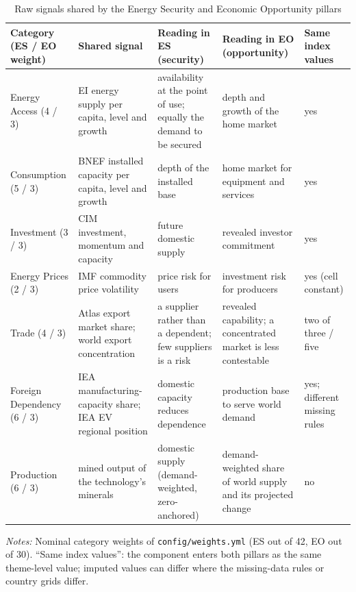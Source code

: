 \begin{table}[t]
\centering
\begin{threeparttable}
\caption{Raw signals shared by the Energy Security and Economic Opportunity pillars}
\label{tab:shared_signals}
\scriptsize
\setlength{\tabcolsep}{3pt}
\begin{tabularx}{\textwidth}{@{}>{\raggedright\arraybackslash}p{2.0cm}
  >{\raggedright\arraybackslash}p{2.9cm}
  >{\raggedright\arraybackslash}X
  >{\raggedright\arraybackslash}X
  >{\centering\arraybackslash}p{1.3cm}@{}}
\toprule
Category (ES / EO weight) & Shared signal & Reading in ES (security) & Reading in EO (opportunity) & Same index values\\
\midrule
Energy Access (4 / 3) & EI energy supply per capita, level and growth &
availability at the point of use; equally the demand to be secured &
depth and growth of the home market & yes\\
\addlinespace
Consumption (5 / 3) & BNEF installed capacity per capita, level and growth &
depth of the installed base & home market for equipment and services & yes\\
\addlinespace
Investment (3 / 3) & CIM investment, momentum and capacity &
future domestic supply & revealed investor commitment & yes\\
\addlinespace
Energy Prices (2 / 3) & IMF commodity price volatility & price risk for users &
investment risk for producers & yes (cell constant)\\
\addlinespace
Trade (4 / 3) & Atlas export market share; world export concentration &
a supplier rather than a dependent; few suppliers is a risk &
revealed capability; a concentrated market is less contestable & two of three / five\\
\addlinespace
Foreign Dependency (6 / 3) & IEA manufacturing-capacity share; IEA EV regional position &
domestic capacity reduces dependence & production base to serve world demand &
yes; different missing rules\\
\addlinespace
Production (6 / 3) & mined output of the technology's minerals &
domestic supply (demand-weighted, zero-anchored) & demand-weighted share of world supply and its
projected change & no\\
\bottomrule
\end{tabularx}
\begin{tablenotes}[flushleft]\footnotesize
\item \textit{Notes:} Nominal category weights of \texttt{config/weights.yml} (ES out of 42, EO
out of 30). ``Same index values'': the component enters both pillars as the same theme-level
value; imputed values can differ where the missing-data rules or country grids differ.
\end{tablenotes}
\end{threeparttable}
\end{table}

